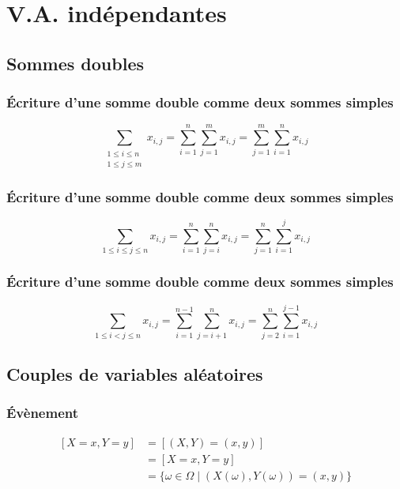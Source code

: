 \section{V.A. indépendantes}
    \subsection{Sommes doubles}

        \subsubsection{Écriture d'une somme double comme deux sommes simples}
            \begin{equation*}
                \sum_{\substack{1 \le i \le n \\ 1 \le j \le m}} x_{i, j} = \sum_{i=1}^{n}\sum_{j=1}^{m} x_{i, j} = \sum_{j=1}^{m}\sum_{i=1}^{n} x_{i, j}
            \end{equation*}

        \subsubsection{Écriture d'une somme double comme deux sommes simples}
            \begin{equation*}
                \sum_{1 \le i \le j \le n} x_{i, j} = \sum_{i=1}^{n}\sum_{j=i}^{n} x_{i, j} = \sum_{j=1}^{n}\sum_{i=1}^{j} x_{i, j}
            \end{equation*}

        \subsubsection{Écriture d'une somme double comme deux sommes simples}
            \begin{equation*}
                \sum_{1 \le i < j \le n} x_{i, j} = \sum_{i=1}^{n-1}\sum_{j=i+1}^{n} x_{i, j} = \sum_{j=2}^{n}\sum_{i=1}^{j-1} x_{i, j}
            \end{equation*}

    \subsection{Couples de variables aléatoires}
        \subsubsection{Évènement}
            \begin{equation*}
                \begin{split}
                    [X = x, Y = y] &= [(X, Y) = (x, y)]\\
                    &= [X = x, Y = y]\\
                    &= \{\omega \in \Omega \mid (X(\omega), Y(\omega)) = (x, y)\}
                \end{split}
            \end{equation*}

